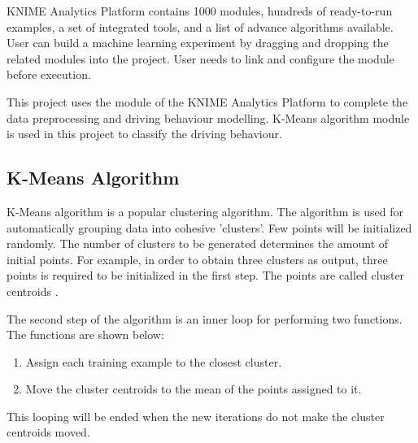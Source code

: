 KNIME Analytics Platform contains 1000 modules, hundreds of ready-to-run examples, a set of integrated tools, and a list of advance algorithms available. User can build a machine learning experiment by dragging and dropping the related modules into the project. User needs to link and configure the module before execution.

This project uses the module of the KNIME Analytics Platform to complete the data preprocessing and driving behaviour modelling. K-Means algorithm module is used in this project to classify the driving behaviour.\cite{knime}

\subsection{K-Means Algorithm}
K-Means algorithm is a popular clustering algorithm. The algorithm is used for automatically grouping data into cohesive 'clusters'. Few points will be initialized randomly. The number of clusters to be generated determines the amount of initial points. For example, in order to obtain three clusters as output, three points is required to be initialized in the first step. The points are called cluster centroids \cite{andrew:2016}.

The second step of the algorithm is an inner loop for performing two functions. The functions are shown below:
\begin{enumerate}
\item Assign each training example to the closest cluster.
\item Move the cluster centroids to the mean of the points assigned to it.
\end{enumerate} 

This looping will be ended when the new iterations do not make the cluster centroids moved.

